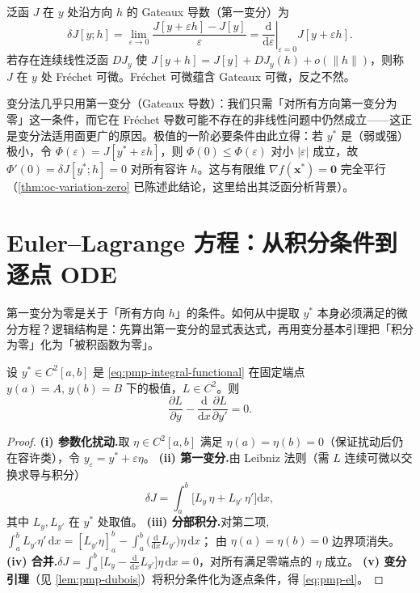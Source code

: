 \begin{definition}\label{def:pmp-first-variation}
泛函 $J$ 在 $y$ 处沿方向 $h$ 的 Gateaux 导数（第一变分）为
\begin{equation}
  \delta J[y;h]=\lim_{\varepsilon\to 0}\frac{J[y+\varepsilon h]-J[y]}{\varepsilon}
  =\left.\frac{\mathrm d}{\mathrm d\varepsilon}\right|_{\varepsilon=0}J[y+\varepsilon h].
  \label{eq:pmp-gateaux}
\end{equation}
若存在连续线性泛函 $DJ_y$ 使 $J[y+h]=J[y]+DJ_y(h)+o(\|h\|)$，则称 $J$ 在 $y$ 处 Fréchet 可微。Fréchet 可微蕴含 Gateaux 可微，反之不然。
\end{definition}

变分法几乎只用第一变分（Gateaux 导数）：我们只需「对所有方向第一变分为零」这一条件，而它在 Fréchet 导数可能不存在的非线性问题中仍然成立——这正是变分法适用面更广的原因。极值的一阶必要条件由此立得：若 $y^\ast$ 是（弱或强）极小，令 $\Phi(\varepsilon)=J[y^\ast+\varepsilon h]$，则 $\Phi(0)\le\Phi(\varepsilon)$ 对小 $|\varepsilon|$ 成立，故 $\Phi'(0)=\delta J[y^\ast;h]=0$ 对所有容许 $h$。这与有限维 $\nabla f(\mathbf x^\ast)=\mathbf 0$ 完全平行（\cref{thm:oc-variation-zero} 已陈述此结论，这里给出其泛函分析背景）。

\section{Euler--Lagrange 方程：从积分条件到逐点 ODE}
\label{sec:pmp-el}

第一变分为零是关于「所有方向 $h$」的条件。如何从中提取 $y^\ast$ 本身必须满足的微分方程？逻辑结构是：先算出第一变分的显式表达式，再用变分基本引理把「积分为零」化为「被积函数为零」。

\begin{theorem}\label{thm:pmp-el}
设 $y^\ast\in C^2[a,b]$ 是 \cref{eq:pmp-integral-functional} 在固定端点 $y(a)=A,\,y(b)=B$ 下的极值，$L\in C^2$。则
\begin{equation}
  \frac{\partial L}{\partial y}-\frac{\mathrm d}{\mathrm dx}\frac{\partial L}{\partial y'}=0.
  \label{eq:pmp-el}
\end{equation}
\end{theorem}

\begin{proof}
\textbf{(i) 参数化扰动.}\;取 $\eta\in C^2[a,b]$ 满足 $\eta(a)=\eta(b)=0$（保证扰动后仍在容许类），令 $y_\varepsilon=y^\ast+\varepsilon\eta$。
\textbf{(ii) 第一变分.}\;由 Leibniz 法则（需 $L$ 连续可微以交换求导与积分）
\begin{equation}
  \delta J=\int_a^b\Big[L_y\,\eta+L_{y'}\,\eta'\Big]\mathrm dx,
  \label{eq:pmp-el-first-var}
\end{equation}
其中 $L_y,L_{y'}$ 在 $y^\ast$ 处取值。
\textbf{(iii) 分部积分.}\;对第二项,
$\int_a^b L_{y'}\eta'\,\mathrm dx=[L_{y'}\eta]_a^b-\int_a^b\big(\tfrac{\mathrm d}{\mathrm dx}L_{y'}\big)\eta\,\mathrm dx$；
由 $\eta(a)=\eta(b)=0$ 边界项消失。
\textbf{(iv) 合并.}\;$\delta J=\int_a^b\big[L_y-\tfrac{\mathrm d}{\mathrm dx}L_{y'}\big]\eta\,\mathrm dx=0$，对所有满足零端点的 $\eta$ 成立。
\textbf{(v) 变分引理}（见 \cref{lem:pmp-dubois}）将积分条件化为逐点条件，得 \cref{eq:pmp-el}。
\end{proof}

